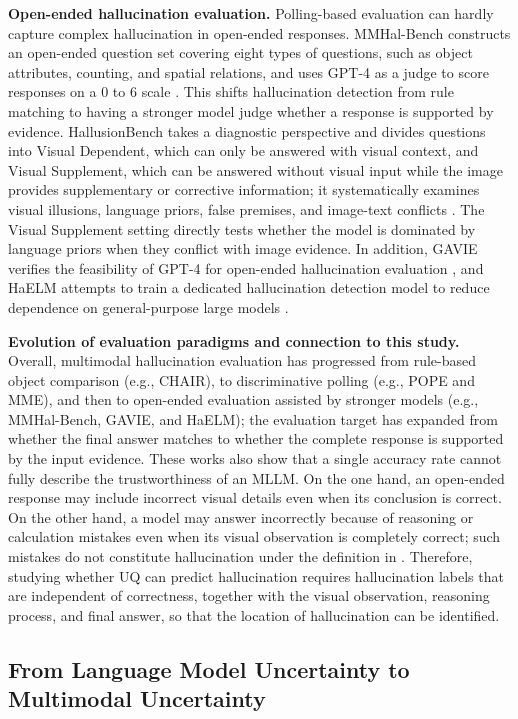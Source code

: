 \textbf{Open-ended hallucination evaluation.} Polling-based evaluation can hardly capture complex hallucination in open-ended responses. MMHal-Bench constructs an open-ended question set covering eight types of questions, such as object attributes, counting, and spatial relations, and uses GPT-4 as a judge to score responses on a 0 to 6 scale \citep{sun2023aligning}. This shifts hallucination detection from rule matching to having a stronger model judge whether a response is supported by evidence. HallusionBench takes a diagnostic perspective and divides questions into Visual Dependent, which can only be answered with visual context, and Visual Supplement, which can be answered without visual input while the image provides supplementary or corrective information; it systematically examines visual illusions, language priors, false premises, and image-text conflicts \citep{guan2024hallusionbench}. The Visual Supplement setting directly tests whether the model is dominated by language priors when they conflict with image evidence. In addition, GAVIE verifies the feasibility of GPT-4 for open-ended hallucination evaluation \citep{liu2023mitigating}, and HaELM attempts to train a dedicated hallucination detection model to reduce dependence on general-purpose large models \citep{wang2023evaluation}.

\textbf{Evolution of evaluation paradigms and connection to this study.} Overall, multimodal hallucination evaluation has progressed from rule-based object comparison (e.g., CHAIR), to discriminative polling (e.g., POPE and MME), and then to open-ended evaluation assisted by stronger models (e.g., MMHal-Bench, GAVIE, and HaELM); the evaluation target has expanded from whether the final answer matches to whether the complete response is supported by the input evidence. These works also show that a single accuracy rate cannot fully describe the trustworthiness of an MLLM. On the one hand, an open-ended response may include incorrect visual details even when its conclusion is correct. On the other hand, a model may answer incorrectly because of reasoning or calculation mistakes even when its visual observation is completely correct; such mistakes do not constitute hallucination under the definition in . Therefore, studying whether UQ can predict hallucination requires hallucination labels that are independent of correctness, together with the visual observation, reasoning process, and final answer, so that the location of hallucination can be identified.

\subsection{From Language Model Uncertainty to Multimodal Uncertainty}
\label{subsec:from_llm_to_mllm}

